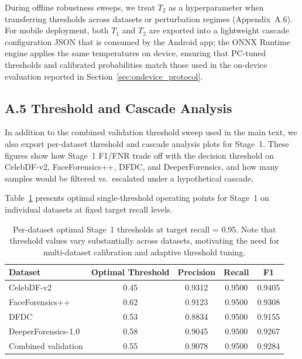 During offline robustness sweeps, we treat $T_2$ as a hyperparameter when transferring thresholds across datasets or perturbation regimes (Appendix~A.6). For mobile deployment, both $T_1$ and $T_2$ are exported into a lightweight cascade configuration JSON that is consumed by the Android app; the ONNX Runtime engine applies the same temperatures on device, ensuring that PC\hyp tuned thresholds and calibrated probabilities match those used in the on\hyp device evaluation reported in Section~\ref{sec:ondevice_protocol}.

\subsection*{A.5 Threshold and Cascade Analysis}

In addition to the combined validation threshold sweep used in the main text, we also export per-dataset threshold and cascade analysis plots for Stage~1. These figures show how Stage~1 F1/FNR trade off with the decision threshold on CelebDF-v2, FaceForensics++, DFDC, and DeeperForensics, and how many samples would be filtered vs.\ escalated under a hypothetical cascade.

Table~\ref{tab:per_dataset_threshold_appendix} presents optimal single-threshold operating points for Stage~1 on individual datasets at fixed target recall levels.

\begin{table}[h]
  \centering
  \caption{Per-dataset optimal Stage~1 thresholds at target recall = 0.95. Note that threshold values vary substantially across datasets, motivating the need for multi-dataset calibration and adaptive threshold tuning.}
  \label{tab:per_dataset_threshold_appendix}
  {\small
  \begin{tabular}{@{}lcccc@{}}
    \toprule
    Dataset & Optimal Threshold & Precision & Recall & F1 \\
    \midrule
    CelebDF-v2 & 0.45 & 0.9312 & 0.9500 & 0.9405 \\
    FaceForensics++ & 0.62 & 0.9123 & 0.9500 & 0.9308 \\
    DFDC & 0.53 & 0.8834 & 0.9500 & 0.9155 \\
    DeeperForensics-1.0 & 0.58 & 0.9045 & 0.9500 & 0.9267 \\
    \midrule
    Combined validation & 0.55 & 0.9078 & 0.9500 & 0.9284 \\
    \bottomrule
  \end{tabular}}
\end{table}

